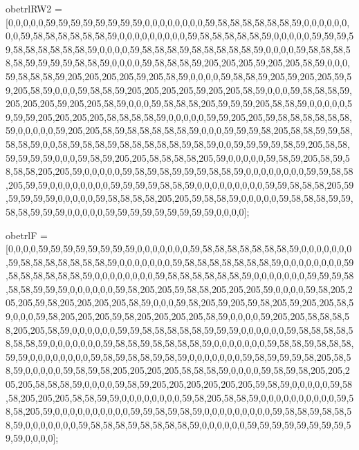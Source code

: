 obetrlRW2 = [0,0,0,0,0,59,59,59,59,59,59,59,59,0,0,0,0,0,0,0,0,59,58,58,58,58,58,58,59,0,0,0,0,0,0,0,0,59,58,58,58,58,58,58,59,0,0,0,0,0,0,0,0,0,59,58,58,58,58,58,59,0,0,0,0,0,59,59,59,59,58,58,58,58,58,58,59,0,0,0,0,59,58,58,58,59,58,58,58,58,58,59,0,0,0,0,59,58,58,58,58,58,59,59,59,59,58,58,59,0,0,0,0,59,58,58,58,59,205,205,205,59,205,205,58,59,0,0,0,59,58,58,58,59,205,205,205,205,59,205,58,59,0,0,0,0,59,58,58,59,205,59,205,205,59,59,205,58,59,0,0,0,59,58,58,59,205,205,205,205,59,205,205,58,59,0,0,0,59,58,58,58,59,205,205,205,59,205,205,58,59,0,0,0,59,58,58,58,205,59,59,59,205,58,58,59,0,0,0,0,0,59,59,59,205,205,205,205,58,58,58,58,59,0,0,0,0,0,59,59,205,205,59,58,58,58,58,58,58,59,0,0,0,0,0,59,205,205,58,59,58,58,58,58,58,59,0,0,0,59,59,59,58,205,58,58,59,59,58,58,58,59,0,0,58,59,58,58,59,58,58,58,58,58,59,58,59,0,0,59,59,59,59,58,59,205,58,58,59,59,59,59,0,0,0,59,58,59,205,205,58,58,58,58,205,59,0,0,0,0,0,59,58,59,205,58,59,58,58,58,205,205,59,0,0,0,0,0,59,58,59,58,59,59,59,58,58,59,0,0,0,0,0,0,0,0,59,59,58,58,205,59,59,0,0,0,0,0,0,0,0,59,59,59,59,58,58,59,0,0,0,0,0,0,0,0,0,59,59,58,58,58,205,59,59,59,59,59,0,0,0,0,0,59,58,58,58,58,205,205,59,58,58,59,0,0,0,0,0,59,58,58,58,59,59,58,58,59,59,59,0,0,0,0,0,59,59,59,59,59,59,59,59,59,0,0,0,0];

obetrlF = [0,0,0,0,59,59,59,59,59,59,59,59,0,0,0,0,0,0,0,59,58,58,58,58,58,58,58,59,0,0,0,0,0,0,0,59,58,58,58,58,58,58,58,59,0,0,0,0,0,0,0,59,58,58,58,58,58,58,58,59,0,0,0,0,0,0,0,0,59,58,58,58,58,58,58,59,0,0,0,0,0,0,0,0,59,58,58,58,58,58,58,59,0,0,0,0,0,0,0,59,59,59,58,58,58,59,59,59,0,0,0,0,0,0,59,58,205,205,59,58,58,205,205,205,59,0,0,0,0,59,58,205,205,205,59,58,205,205,205,205,58,59,0,0,0,59,58,205,59,205,59,58,205,59,205,205,58,59,0,0,0,59,58,205,205,205,59,58,205,205,205,205,58,59,0,0,0,0,59,205,205,58,58,58,58,205,205,58,59,0,0,0,0,0,0,59,59,58,58,58,58,58,59,59,59,0,0,0,0,0,0,59,58,58,58,58,58,58,58,59,0,0,0,0,0,0,0,59,58,58,59,58,58,58,58,59,0,0,0,0,0,0,0,59,58,58,59,58,58,58,59,59,0,0,0,0,0,0,0,0,59,58,59,58,58,59,58,59,0,0,0,0,0,0,0,59,58,59,59,59,58,205,58,58,59,0,0,0,0,0,59,58,59,58,205,205,205,205,58,58,58,59,0,0,0,0,59,58,59,58,205,205,205,205,58,58,58,59,0,0,0,0,59,58,59,205,205,205,205,205,205,59,58,59,0,0,0,0,0,59,58,58,205,205,205,58,58,59,59,0,0,0,0,0,0,0,0,59,58,205,58,58,59,0,0,0,0,0,0,0,0,0,0,59,58,58,205,59,0,0,0,0,0,0,0,0,0,0,59,59,58,59,58,59,0,0,0,0,0,0,0,0,0,59,58,58,59,58,58,58,59,0,0,0,0,0,0,0,59,58,58,58,59,58,58,58,58,59,0,0,0,0,0,0,59,59,59,59,59,59,59,59,59,59,0,0,0,0];

